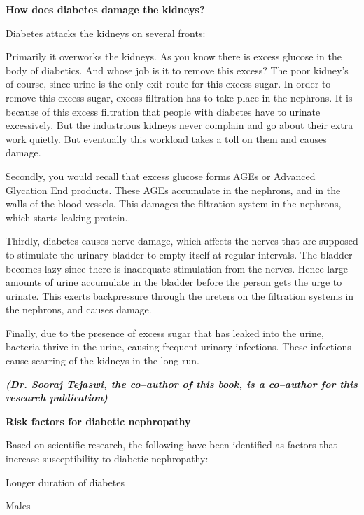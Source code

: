 {\textbf{How does diabetes damage the kidneys?}

Diabetes attacks the kidneys on several fronts:

\item Primarily it overworks the kidneys. As you know there is excess glucose in the body of diabetics. And whose job is it to remove this excess? The poor kidney’s of course, since urine is the only exit route for this excess sugar. In order to remove this excess sugar, excess filtration has to take place in the nephrons. It is because of this excess filtration that people with diabetes have to urinate excessively. But the industrious kidneys never complain and go about their extra work quietly. But eventually this workload takes a toll on them and causes damage.

 \item Secondly, you would recall that excess glucose forms AGEs or Advanced Glycation End products. These AGEs accumulate in the nephrons, and in the walls of the blood vessels. This damages the filtration system in the nephrons, which starts leaking protein..

 \item Thirdly, diabetes causes nerve damage, which affects the nerves that are supposed to stimulate the urinary bladder to empty itself at regular intervals. The bladder becomes lazy since there is inadequate stimulation from the nerves. Hence large amounts of urine accumulate in the bladder before the person gets the urge to urinate. This exerts backpressure through the ureters on the filtration systems in the nephrons, and causes damage.

 \item 
 Finally, due to the presence of excess sugar that has leaked into the urine, bacteria thrive in the urine, causing frequent urinary infections. These infections cause scarring of the kidneys in the long run.\supskpt{\footnote{}}

 \textbf{\textit{(Dr. Sooraj Tejaswi, the co–author of this book, is a co–author for this research publication)}}


\textbf{Risk factors for diabetic nephropathy}

Based on scientific research, the following have been identified as factors that increase susceptibility to diabetic nephropathy:

\item Longer duration of diabetes

 \item Males

}
